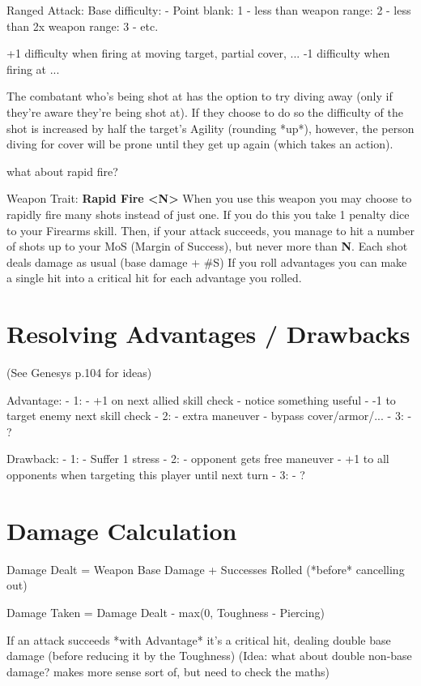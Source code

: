 Ranged Attack:  
Base difficulty: 
    - Point blank: 1
    - less than weapon range: 2
    - less than 2x weapon range: 3
    - etc.

+1 difficulty when firing at moving target, partial cover, ...
-1 difficulty when firing at ...

The combatant who's being shot at has the option to try diving away (only if they're aware they're being shot at). If they choose to do so the difficulty of the shot is increased by half the target's Agility (rounding *up*), however, the person diving for cover will be prone until they get up again (which takes an action).

what about rapid fire?  

Weapon Trait: \textbf{Rapid Fire  <N>}
When you use this weapon you may choose to rapidly fire many shots instead of just one. If you do this you take 1 penalty dice to your Firearms skill. Then, if your attack succeeds, you manage to hit a number of shots up to your MoS (Margin of Success), but never more than \textbf{N}. Each shot deals damage as usual (base damage + \#S)
If you roll advantages you can make a single hit into a critical hit for each advantage you rolled.



\section{Resolving Advantages / Drawbacks}

(See Genesys p.104 for ideas)

Advantage:
    - 1:
        - +1 on next allied skill check
        - notice something useful
        - -1 to target enemy next skill check
    - 2:
        - extra maneuver
        - bypass cover/armor/...
    - 3:
        - ?

Drawback:
  - 1:
      - Suffer 1 stress
  - 2:
      - opponent gets free maneuver
      - +1 to all opponents when targeting this player until next turn
  - 3:
      - ?
  


\section{Damage Calculation}

Damage Dealt = Weapon Base Damage + Successes Rolled (*before* cancelling out)

Damage Taken = Damage Dealt - max(0, Toughness - Piercing) 

If an attack succeeds *with Advantage* it's a critical hit, dealing double base damage (before reducing it by the Toughness)
(Idea: what about double non-base damage? makes more sense sort of, but need to check the maths)


